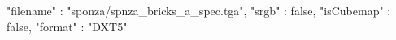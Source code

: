 { 
	"filename" : "sponza/spnza_bricks_a_spec.tga", 
	"srgb" : false,
	"isCubemap" : false,
	"format" : "DXT5"
}